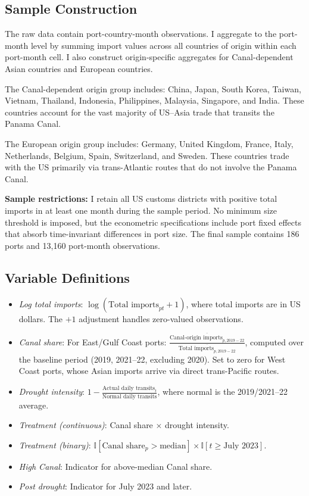 \documentclass[12pt]{article}
\newcommand{\ind}{\mathbb{I}}
\begin{document}
\subsection{Sample Construction}

The raw data contain port-country-month observations. I aggregate to the port-month level by summing import values across all countries of origin within each port-month cell. I also construct origin-specific aggregates for Canal-dependent Asian countries and European countries.

The Canal-dependent origin group includes: China, Japan, South Korea, Taiwan, Vietnam, Thailand, Indonesia, Philippines, Malaysia, Singapore, and India. These countries account for the vast majority of US--Asia trade that transits the Panama Canal.

The European origin group includes: Germany, United Kingdom, France, Italy, Netherlands, Belgium, Spain, Switzerland, and Sweden. These countries trade with the US primarily via trans-Atlantic routes that do not involve the Panama Canal.

\textbf{Sample restrictions:} I retain all US customs districts with positive total imports in at least one month during the sample period. No minimum size threshold is imposed, but the econometric specifications include port fixed effects that absorb time-invariant differences in port size. The final sample contains 186 ports and 13,160 port-month observations.

\subsection{Variable Definitions}

\begin{itemize}
    \item \textit{Log total imports}: $\log(\text{Total imports}_{pt} + 1)$, where total imports are in US dollars. The $+1$ adjustment handles zero-valued observations.
    \item \textit{Canal share}: For East/Gulf Coast ports: $\frac{\overline{\text{Canal-origin imports}_{p, 2019-22}}}{\overline{\text{Total imports}_{p, 2019-22}}}$, computed over the baseline period (2019, 2021--22, excluding 2020). Set to zero for West Coast ports, whose Asian imports arrive via direct trans-Pacific routes.
    \item \textit{Drought intensity}: $1 - \frac{\text{Actual daily transits}_t}{\text{Normal daily transits}}$, where normal is the 2019/2021--22 average.
    \item \textit{Treatment (continuous)}: Canal share $\times$ drought intensity.
    \item \textit{Treatment (binary)}: $\ind[\text{Canal share}_p > \text{median}] \times \ind[t \geq \text{July 2023}]$.
    \item \textit{High Canal}: Indicator for above-median Canal share.
    \item \textit{Post drought}: Indicator for July 2023 and later.
\end{itemize}
\end{document}

